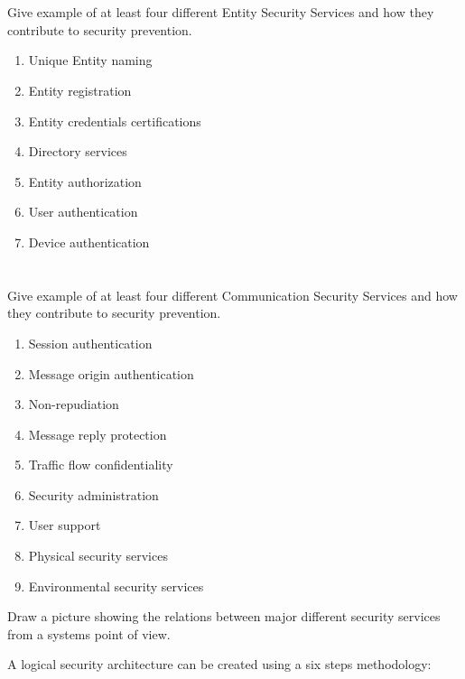 \begin{questions}
\begin{parts}
  \part{} Give example of at least four different Entity Security Services and how they contribute to security prevention.
    \begin{solution}
      \begin{enumerate}[noitemsep]
      \item Unique Entity naming
      \item Entity registration
      \item Entity credentials certifications
      \item Directory services
      \item Entity authorization
      \item User authentication
      \item Device authentication
      \end{enumerate}
    \end{solution}

  \part{} Give example of at least four different Communication Security Services and how they contribute to security prevention.
    \begin{solution}
      \begin{enumerate}[noitemsep]
      \item Session authentication
      \item Message origin authentication
      \item Non-repudiation
      \item Message reply protection
      \item Traffic flow confidentiality
      \item Security administration
      \item User support
      \item Physical security services
      \item Environmental security services
      \end{enumerate}
    \end{solution}

  \end{parts}

\item Draw a picture showing the relations between major different security services from a systems point of view.
\item A logical security architecture can be created using a six steps methodology:
  \begin{parts}

\end{parts}
\end{questions}
